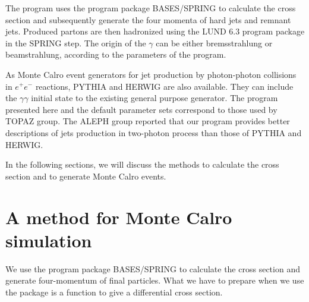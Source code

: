 The program uses the program package BASES/SPRING\cite{BASES86,GRACE92}
to calculate the cross section and subsequently generate 
the four momenta of hard jets and remnant jets.
Produced partons are then hadronized using the 
LUND 6.3\cite{LUND63} program 
package in the SPRING step.
The origin of the $\gamma$ can be either bremsstrahlung
or beamstrahlung, according to the parameters of the program.

As Monte Calro event generators
for jet production by 
photon-photon collisions in $e^+e^-$ reactions,
PYTHIA\cite{PYTHIA56}
and HERWIG\cite{HERWIG} are also available.
They can include the $\gamma\gamma$ initial state to the existing
general purpose generator.  
The program presented here and the default parameter sets
correspond to those used by TOPAZ group\cite{TOPAZ93B,HAYASHII}.
The ALEPH\cite{ALEPH93} group reported that our program provides better 
descriptions of jets production in two-photon 
process than those of PYTHIA and HERWIG.


In the following sections, we will discuss the 
methods to calculate the cross section and
to generate Monte Calro events.


%
%


\section{A method for Monte Calro simulation}
\label{SECMETHOD}
We use the program package BASES/SPRING\cite{BASES86,GRACE92} to
calculate the cross section and generate four-momentum of final
particles. What we have to prepare when we use the package
is a function to give a differential cross section.

